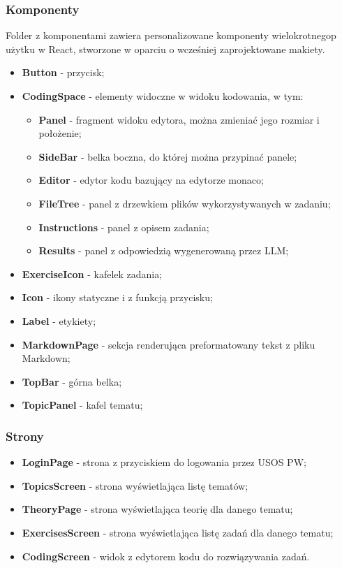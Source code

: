 \documentclass[12pt,a4paper]{article}
\begin{document}
\subsubsection{Komponenty}
Folder z komponentami zawiera personalizowane komponenty wielokrotnegop użytku w React, stworzone w oparciu o wcześniej zaprojektowane makiety.
\begin{itemize}
    \item \textbf{Button} - przycisk;
    \item \textbf{CodingSpace} - elementy widoczne w widoku kodowania, w tym: 
    \begin{itemize}
        \item \textbf{Panel} - fragment widoku edytora, można zmieniać jego rozmiar i położenie;
        \item \textbf{SideBar} - belka boczna, do której można przypinać panele;
        \item \textbf{Editor} - edytor kodu bazujący na edytorze monaco;
        \item \textbf{FileTree} - panel z drzewkiem plików wykorzystywanych w zadaniu;
        \item \textbf{Instructions} - panel z opisem zadania;
        \item \textbf{Results} - panel z odpowiedzią wygenerowaną przez LLM;
    \end{itemize}
    \item \textbf{ExerciseIcon} - kafelek zadania;
    \item \textbf{Icon} - ikony statyczne i z funkcją przycisku;
    \item \textbf{Label} - etykiety;
    \item \textbf{MarkdownPage} - sekcja renderująca preformatowany tekst z pliku Markdown;
    \item \textbf{TopBar} - górna belka;
    \item \textbf{TopicPanel} - kafel tematu;
\end{itemize}

\subsubsection{Strony}
\begin{itemize}
    \item \textbf{LoginPage} - strona z przyciskiem do logowania przez USOS PW;
    \item \textbf{TopicsScreen} - strona wyświetlająca listę tematów;
    \item \textbf{TheoryPage} - strona wyświetlająca teorię dla danego tematu;
    \item \textbf{ExercisesScreen} - strona wyświetlająca listę zadań dla danego tematu;
    \item \textbf{CodingScreen} - widok z edytorem kodu do rozwiązywania zadań.
\end{itemize}
\end{document}
